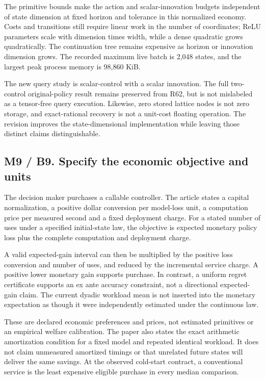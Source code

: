 The primitive bounds make the action and scalar-innovation budgets
independent of state dimension at fixed horizon and tolerance in this
normalized economy. Costs and transitions still require linear work in
the number of coordinates; ReLU parameters scale with dimension times
width, while a dense quadratic grows quadratically. The continuation
tree remains expensive as horizon or innovation dimension grows. The
recorded maximum live batch is 2,048 states, and the largest peak
process memory is 98,860 KiB.

The new query study is scalar-control with a scalar innovation. The full
two-control original-policy result remains preserved from R62, but is
not mislabeled as a tensor-free query execution. Likewise, zero stored
lattice nodes is not zero storage, and exact-rational recovery is not a
unit-cost floating operation. The revision improves the
state-dimensional implementation while leaving those distinct claims
distinguishable.

\hypertarget{m9-b9.-specify-the-economic-objective-and-units}{%
\subsection{M9 / B9. Specify the economic objective and
units}\label{m9-b9.-specify-the-economic-objective-and-units}}

The decision maker purchases a callable controller. The article states a
capital normalization, a positive dollar conversion per model-loss unit,
a computation price per measured second and a fixed deployment charge.
For a stated number of uses under a specified initial-state law, the
objective is expected monetary policy loss plus the complete computation
and deployment charge.

A valid expected-gain interval can then be multiplied by the positive
loss conversion and number of uses, and reduced by the incremental
service charge. A positive lower monetary gain supports purchase. In
contrast, a uniform regret certificate supports an ex ante accuracy
constraint, not a directional expected-gain claim. The current dyadic
workload mean is not inserted into the monetary expectation as though it
were independently estimated under the continuous law.

These are declared economic preferences and prices, not estimated
primitives or an empirical welfare calibration. The paper also states
the exact arithmetic amortization condition for a fixed model and
repeated identical workload. It does not claim unmeasured amortized
timings or that unrelated future states will deliver the same savings.
At the observed cold-start contract, a conventional service is the least
expensive eligible purchase in every median comparison.

